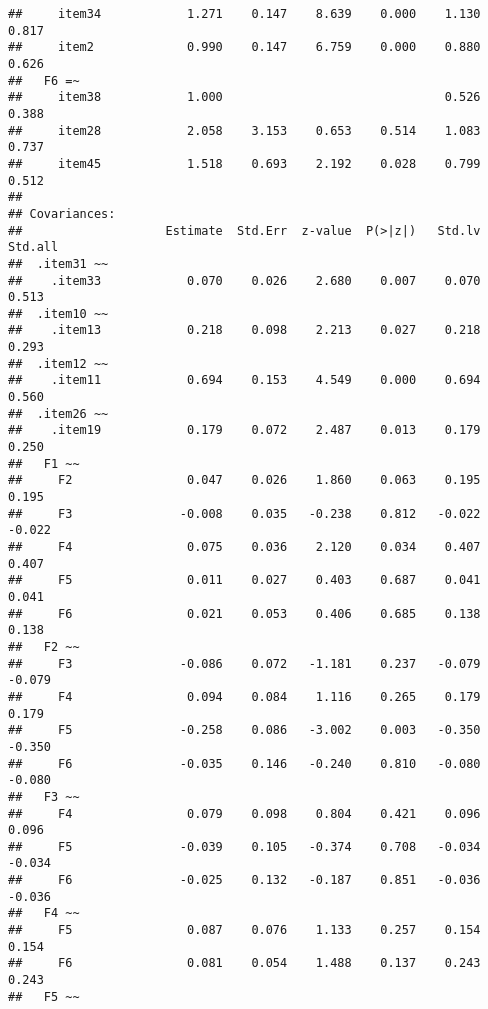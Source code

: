 \documentclass[
  english,
  man]{apa6}
\begin{document}
\begin{verbatim}
##     item34            1.271    0.147    8.639    0.000    1.130    0.817
##     item2             0.990    0.147    6.759    0.000    0.880    0.626
##   F6 =~                                                                 
##     item38            1.000                               0.526    0.388
##     item28            2.058    3.153    0.653    0.514    1.083    0.737
##     item45            1.518    0.693    2.192    0.028    0.799    0.512
## 
## Covariances:
##                    Estimate  Std.Err  z-value  P(>|z|)   Std.lv  Std.all
##  .item31 ~~                                                             
##    .item33            0.070    0.026    2.680    0.007    0.070    0.513
##  .item10 ~~                                                             
##    .item13            0.218    0.098    2.213    0.027    0.218    0.293
##  .item12 ~~                                                             
##    .item11            0.694    0.153    4.549    0.000    0.694    0.560
##  .item26 ~~                                                             
##    .item19            0.179    0.072    2.487    0.013    0.179    0.250
##   F1 ~~                                                                 
##     F2                0.047    0.026    1.860    0.063    0.195    0.195
##     F3               -0.008    0.035   -0.238    0.812   -0.022   -0.022
##     F4                0.075    0.036    2.120    0.034    0.407    0.407
##     F5                0.011    0.027    0.403    0.687    0.041    0.041
##     F6                0.021    0.053    0.406    0.685    0.138    0.138
##   F2 ~~                                                                 
##     F3               -0.086    0.072   -1.181    0.237   -0.079   -0.079
##     F4                0.094    0.084    1.116    0.265    0.179    0.179
##     F5               -0.258    0.086   -3.002    0.003   -0.350   -0.350
##     F6               -0.035    0.146   -0.240    0.810   -0.080   -0.080
##   F3 ~~                                                                 
##     F4                0.079    0.098    0.804    0.421    0.096    0.096
##     F5               -0.039    0.105   -0.374    0.708   -0.034   -0.034
##     F6               -0.025    0.132   -0.187    0.851   -0.036   -0.036
##   F4 ~~                                                                 
##     F5                0.087    0.076    1.133    0.257    0.154    0.154
##     F6                0.081    0.054    1.488    0.137    0.243    0.243
##   F5 ~~                                                                 

\end{verbatim}
\end{document}
